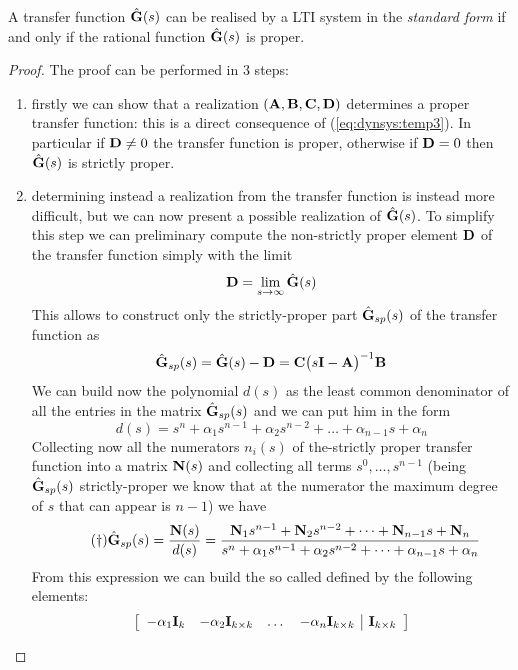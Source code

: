	\begin{theorem}
		A transfer function $\hat {\mathbf{G}}(s)$ can be realised by a LTI system in the \textit{standard form} if and only if the rational function $\hat{\mathbf{G}}(s)$ is proper.
	\end{theorem}
	\begin{proof}
		The proof can be performed in 3 steps:
		\begin{enumerate}[\itshape a)]
			\item firstly we can show that a realization $(\mathbf{A},\mathbf{B},\mathbf{C},\mathbf{D})$ determines a proper transfer function: this is a direct consequence of (\ref{eq:dynsys:temp3}). In particular if $\mathbf{D} \neq 0$ the transfer function is proper, otherwise if $\mathbf{D} = 0$ then $\hat {\mathbf{G}}(s)$ is strictly proper.
			\item determining instead a realization from the transfer function is instead more difficult, but we can now present a possible realization of $\hat {\mathbf{G}}(s)$. To simplify this step we can preliminary compute the non-strictly proper element $\mathbf{D}$ of the transfer function simply with the limit
			\[ \mathbf{D} = \lim_{s\rightarrow \infty} \hat{\mathbf{G}}(s) \]
			This allows to construct only the strictly-proper part $\hat {\mathbf{G}}_{sp}(s)$ of the transfer function as
			\[ \hat {\mathbf{G}}_{sp}(s) = \hat {\mathbf{G}}(s) - \mathbf{D} = \mathbf{C} \big(s\mathbf{I}-\mathbf{A}\big)^{-1} \mathbf{B} \]
			We can build now the polynomial $d(s)$ as the least common denominator of all the entries in the matrix $\hat {\mathbf{G}}_{sp}(s)$ and we can put him in the form
			\[ d(s) = s^n + \alpha_1 s^{n-1} + \alpha_2 s^{n-2} + \dots + \alpha_{n-1}s + \alpha_n \]
			Collecting now all the numerators $n_i(s)$ of the-strictly proper transfer function into a matrix $\mathbf{N}(s)$ and collecting all terms $s^0,\dots, s^{n-1}$ (being $\hat {\mathbf{G}}_{sp}(s)$ strictly-proper we know that at the numerator the maximum degree of $s$ that can appear is $n-1$) we have
			\begin{equation} \tag{$\dagger$}
				\hat {\mathbf{G}}_{sp}(s) = \frac{\mathbf{N}(s)}{d(s)} = \frac{\mathbf{N}_1 s^{n-1} + \mathbf{N}_2 s^{n-2} + \dots + \mathbf{N}_{n-1}s + \mathbf{N}_n }{s^n + \alpha_1 s^{n-1} + \alpha_2 s^{n-2} + \dots + \alpha_{n-1}s + \alpha_n}
			\end{equation}
			From this expression we can build the so called  defined by the following elements:
			\begin{equation} \label{eq:dyn:controllablecanonical}
				\begin{bmatrix} \begin{array}{ c c c c | c}
						-\alpha_1 \mathbf{I}_k & - \alpha_2 \mathbf{I}_{k\times k} & \dots & - \alpha_n \mathbf{I}_{k\times k} & \mathbf{I}_{k\times k} \\

\end{array} \end{bmatrix}
\end{equation}
\end{enumerate}
\end{proof}
